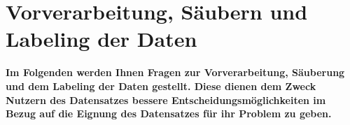 \documentclass{article}
\begin{document}
\section{Vorverarbeitung, Säubern und Labeling der Daten}
\textbf{Im Folgenden werden Ihnen Fragen zur Vorverarbeitung, Säuberung und dem Labeling der Daten gestellt. Diese dienen dem Zweck Nutzern des Datensatzes bessere Entscheidungsmöglichkeiten im Bezug auf die Eignung des Datensatzes für ihr Problem zu geben.}
\begin{Form}
    
\end{Form}
\printbibliography
\end{document}
